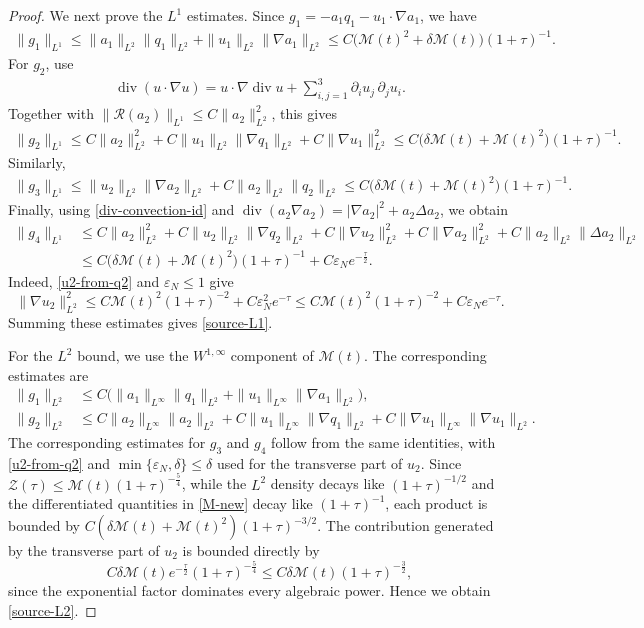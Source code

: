 \documentclass[10pt,reqno]{amsart}
\numberwithin{equation}{section}
\begin{document}
\begin{proof}
We next prove the $L^1$ estimates.  Since
$g_1=-a_1q_1-u_1\cdot\nabla a_1$, we have
\begin{align*}
\|g_1\|_{L^1} \le \|a_1\|_{L^2}\|q_1\|_{L^2} +\|u_1\|_{L^2}\|\nabla a_1\|_{L^2} \le C\big(\mathcal M(t)^2+\delta\mathcal M(t)\big)(1+\tau)^{-1}.
\end{align*}
For $g_2$, use
\begin{align}\label{div-convection-id}
\operatorname{div}(u\cdot\nabla u)
=u\cdot\nabla\operatorname{div}u
+\sum_{i,j=1}^3\partial_i u_j\,\partial_j u_i.
\end{align}
Together with $\|\mathcal R(a_2)\|_{L^1}\le C\|a_2\|_{L^2}^2$, this gives
\begin{align*}
\|g_2\|_{L^1} \le C\|a_2\|_{L^2}^2 +C\|u_1\|_{L^2}\|\nabla q_1\|_{L^2} +C\|\nabla u_1\|_{L^2}^2 \le C\big(\delta\mathcal M(t)+\mathcal M(t)^2\big)(1+\tau)^{-1}.
\end{align*}
Similarly,
\begin{align*}
\|g_3\|_{L^1} \le \|u_2\|_{L^2}\|\nabla a_2\|_{L^2} +C\|a_2\|_{L^2}\|q_2\|_{L^2} \le C\big(\delta\mathcal M(t)+\mathcal M(t)^2\big)(1+\tau)^{-1}.
\end{align*}
Finally, using \eqref{div-convection-id} and
$\operatorname{div}(a_2\nabla a_2)=|\nabla a_2|^2+a_2\Delta a_2$, we obtain
\begin{align*}
\|g_4\|_{L^1} &\le C\|a_2\|_{L^2}^2 +C\|u_2\|_{L^2}\|\nabla q_2\|_{L^2} +C\|\nabla u_2\|_{L^2}^2 +C\|\nabla a_2\|_{L^2}^2 +C\|a_2\|_{L^2}\|\Delta a_2\|_{L^2}\\
&\le C\big(\delta\mathcal M(t)+\mathcal M(t)^2\big)(1+\tau)^{-1}
+C\varepsilon_Ne^{-\frac{\tau}{2}}.
\end{align*}
Indeed, \eqref{u2-from-q2} and $\varepsilon_N\le1$ give
\[
\|\nabla u_2\|_{L^2}^2\le C\mathcal M(t)^2(1+\tau)^{-2}+C\varepsilon_N^2e^{-\tau}\le   C\mathcal M(t)^2(1+\tau)^{-2}+C\varepsilon_Ne^{-\tau}.
\]
 Summing these estimates gives \eqref{source-L1}.


For the $L^2$ bound, we use the $W^{1,\infty}$ component of $\mathcal M(t)$.  The corresponding estimates are
\begin{align*}
\|g_1\|_{L^2}
&\le C\big(\|a_1\|_{L^\infty}\|q_1\|_{L^2}
+\|u_1\|_{L^\infty}\|\nabla a_1\|_{L^2}\big),\\
\|g_2\|_{L^2}
&\le C\|a_2\|_{L^\infty}\|a_2\|_{L^2}
+C\|u_1\|_{L^\infty}\|\nabla q_1\|_{L^2}
+C\|\nabla u_1\|_{L^\infty}\|\nabla u_1\|_{L^2}.
\end{align*}
The corresponding estimates for $g_3$ and $g_4$ follow from the same identities, with \eqref{u2-from-q2} and $\min\{\varepsilon_N,\delta\}\le\delta$ used for the transverse part of $u_2$. Since $\mathcal Z(\tau)\le \mathcal M(t)(1+\tau)^{-\frac{5}{4}}$, while the $L^2$ density decays like $(1+\tau)^{-1/2}$ and the differentiated quantities in \eqref{M-new} decay like $(1+\tau)^{-1}$, each product is bounded by $C(\delta\mathcal M(t)+\mathcal M(t)^2)(1+\tau)^{-3/2}$. The contribution generated by the transverse part of $u_2$ is bounded directly by
\[
C\delta\mathcal M(t)e^{-\frac{\tau}{2}}(1+\tau)^{-\frac{5}{4}}
\le C\delta\mathcal M(t)(1+\tau)^{-\frac{3}{2}},
\]
since the exponential factor dominates every algebraic power.  Hence  we obtain  \eqref{source-L2}.


\end{proof}
\end{document}
